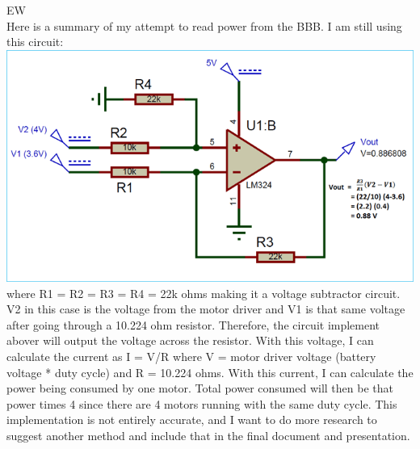\documentclass[fontsize=11pt, %
                             paper=letter, %
                             openany, %
                             captions=tableheading,
                             index=totoc,
                             hyperref]{labbook}
\begin{document}
EW\\
Here is a summary of my attempt to read power from the BBB. I am still using this circuit:
\medbreak\noindent
\includegraphics[scale=0.6]{figs/voltageSubtractor.png}
where R1 = R2 = R3 = R4 = 22k ohms making it a voltage subtractor circuit.
\medbreak\noindent
V2 in this case is the voltage from the motor driver and V1 is that same voltage after going through a 10.224 ohm resistor. Therefore, the circuit implement abover will output the voltage across the resistor. With this voltage, I can calculate the current as I = V/R where V = motor driver voltage (battery voltage * duty cycle) and R = 10.224 ohms. With this current, I can calculate the power being consumed by one motor. Total power consumed will then be that power times 4 since there are 4 motors running with the same duty cycle.
\medbreak\noindent
This implementation is not entirely accurate, and I want to do more research to suggest another method and include that in the final document and presentation.
\end{document}
